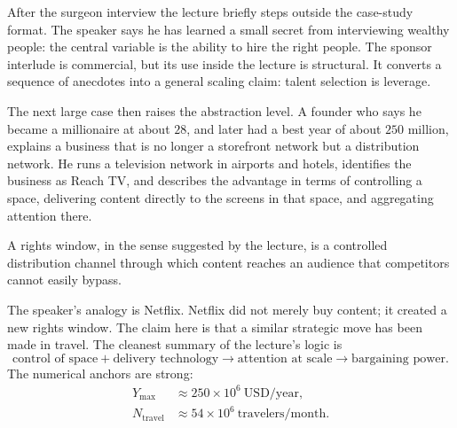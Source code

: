 After the surgeon interview the lecture briefly steps outside the case-study format. The speaker says he has learned a small secret from interviewing wealthy people: the central variable is the ability to hire the right people. The sponsor interlude is commercial, but its use inside the lecture is structural. It converts a sequence of anecdotes into a general scaling claim: talent selection is leverage.

The next large case then raises the abstraction level. A founder who says he became a millionaire at about $28$, and later had a best year of about $250$ million, explains a business that is no longer a storefront network but a distribution network. He runs a television network in airports and hotels, identifies the business as Reach TV, and describes the advantage in terms of controlling a space, delivering content directly to the screens in that space, and aggregating attention there.

\begin{definition}
A rights window, in the sense suggested by the lecture, is a controlled distribution channel through which content reaches an audience that competitors cannot easily bypass.
\end{definition}

The speaker's analogy is Netflix. Netflix did not merely buy content; it created a new rights window. The claim here is that a similar strategic move has been made in travel. The cleanest summary of the lecture's logic is
\begin{equation}
\text{control of space} + \text{delivery technology} \longrightarrow \text{attention at scale} \longrightarrow \text{bargaining power}.
\end{equation}
The numerical anchors are strong:
\begin{align}
Y_{\max} &\approx 250\times 10^6\ \text{USD/year}, \\
N_{\text{travel}} &\approx 54\times 10^6\ \text{travelers/month}.
\end{align}

\begin{figure}[h]
\centering
{}
\end{figure}

